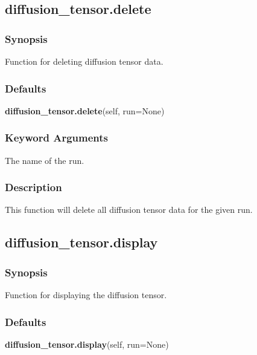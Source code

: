 


\newpage

\subsection{diffusion\_tensor.delete}


\subsubsection{Synopsis}

Function for deleting diffusion tensor data.

\subsubsection{Defaults}

\textsf{\textbf{diffusion\_tensor.delete}(self, run=None)}


\subsubsection{Keyword Arguments}


  The name of the run.


\subsubsection{Description}

This function will delete all diffusion tensor data for the given run.


\newpage

\subsection{diffusion\_tensor.display}


\subsubsection{Synopsis}

Function for displaying the diffusion tensor.

\subsubsection{Defaults}

\textsf{\textbf{diffusion\_tensor.display}(self, run=None)}


